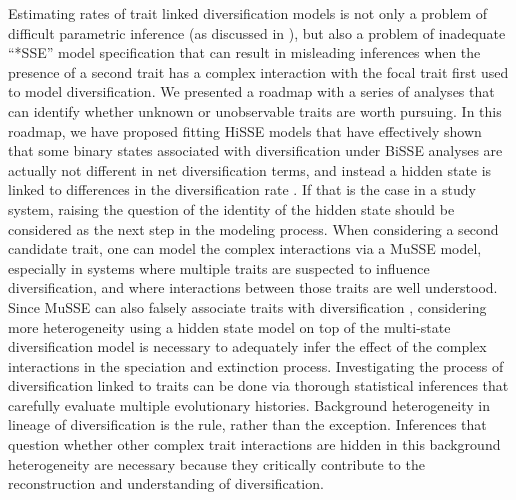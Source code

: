 Estimating rates of trait linked diversification models is not only a problem of difficult parametric inference (as discussed in \citealt{rabosky_2010, beaulieu_2015}), but also a problem of inadequate ``*SSE'' model specification that can result in misleading inferences when the presence of a second trait has a complex interaction with the focal trait first used to model diversification. 
We presented a roadmap with a series of analyses that can identify whether unknown or unobservable traits are worth pursuing. 
In this roadmap, we have proposed fitting HiSSE models that have effectively shown that some binary states associated with diversification under BiSSE analyses are actually not different in net diversification terms, and instead a hidden state is linked to differences in the diversification rate \citep{beaulieu_2016}.  
If that is the case in a study system, raising the question of the identity of the hidden state should be considered as the next step in the modeling process.  %
When considering a second candidate trait, one can model the complex interactions via a MuSSE model, especially in systems where multiple traits are suspected to influence diversification, and where interactions between those traits are well understood. 
Since MuSSE can also falsely associate traits with diversification \citep{fitzjohn_2012}, considering more heterogeneity using a hidden state model on top of the multi-state diversification model is necessary to adequately infer the effect of the complex interactions in the speciation and extinction process.
Investigating the process of diversification linked to traits can be done via thorough statistical inferences that carefully evaluate multiple evolutionary histories. 
Background heterogeneity in lineage of diversification is the rule, rather than the exception. 
Inferences that question whether other complex trait interactions are hidden in this background heterogeneity are necessary because they critically contribute to the reconstruction and understanding of diversification. 


%
%
%
